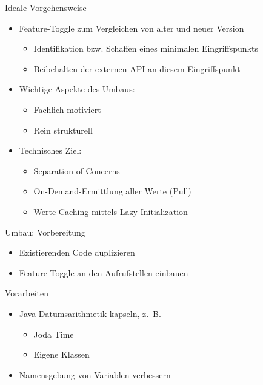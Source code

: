 \begin{frame}[fragile]{Ideale Vorgehensweise}
\begin{itemize}
\item Feature-Toggle zum Vergleichen von alter und neuer Version
\begin{itemize}
\item Identifikation bzw. Schaffen eines minimalen Eingriffspunkts
\item Beibehalten der externen API an diesem Eingriffspunkt
\end{itemize}

\item Wichtige Aspekte des Umbaus:
\begin{itemize}
\item Fachlich motiviert
\item Rein strukturell
\end{itemize}

\item Technisches Ziel:
\begin{itemize}
\item Separation of Concerns
\item On-Demand-Ermittlung aller Werte (\glqq Pull\grqq{})
\item Werte-Caching mittels Lazy-Initialization
\end{itemize}

\end{itemize}
\end{frame}



\begin{frame}[fragile]{Umbau: Vorbereitung}
\begin{itemize}
\item Existierenden Code duplizieren
\item Feature Toggle an den Aufrufstellen einbauen
\end{itemize}
\end{frame}
 
\begin{frame}[fragile]{Vorarbeiten}
\begin{itemize}
\item Java-Datumsarithmetik kapseln, z.~B.
\begin{itemize}
\item Joda Time
\item Eigene Klassen
\end{itemize}
\item Namensgebung von Variablen verbessern
\end{itemize}
\end{frame}

